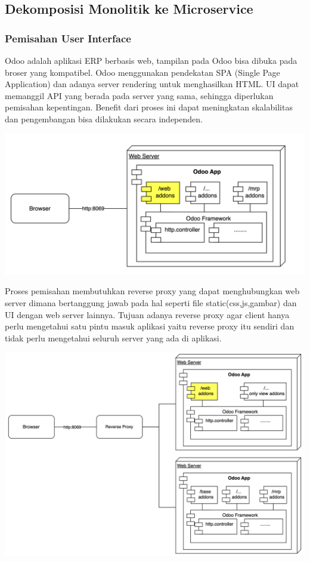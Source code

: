\subsection{Dekomposisi Monolitik ke Microservice}
\subsubsection{Pemisahan User Interface}
Odoo adalah aplikasi ERP berbasis web, tampilan pada Odoo bisa dibuka pada broser yang kompatibel. Odoo menggunakan pendekatan SPA (Single Page Application) dan adanya server rendering untuk menghasilkan HTML. UI dapat memanggil API yang berada pada server yang sama, sehingga diperlukan pemisahan kepentingan. Benefit dari proses ini dapat meningkatan skalabilitas dan pengembangan bisa dilakukan secara independen.
\begin{center}
	\includegraphics[width=14cm]{img/bab_3/monoUI.png}
	\label{fig:asd}
\end{center}
Proses pemisahan membutuhkan reverse proxy yang dapat menghubungkan web server dimana bertanggung jawab pada hal seperti file static(css,js,gambar) dan UI dengan web server lainnya. Tujuan adanya reverse proxy agar client hanya perlu mengetahui satu pintu masuk aplikasi yaitu reverse proxy itu sendiri dan tidak perlu mengetahui seluruh server yang ada di aplikasi.
\begin{center}
	\includegraphics[width=14cm]{img/bab_3/microUI.png}
	\label{fig:asd}
\end{center}

